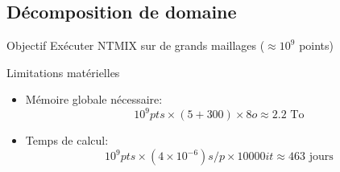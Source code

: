 \documentclass{beamer}
\begin{document}
\subsection{Décomposition de domaine}
\begin{frame}
  \begin{block}{Objectif}
    Exécuter NTMIX sur de grands maillages ($\approx 10^9$ points)
  \end{block}
  \pause
  \begin{alertblock}{Limitations matérielles}
    \begin{itemize}
    \item     Mémoire globale nécessaire: 
      $$10^9pts \times (5+300) \times 8o \approx 2.2 \text{ To}$$
    \item     Temps de calcul: 
      $$10^9 pts\times(4\times10^{-6})s/p\times10000it\approx463 \text{ jours}$$
    \end{itemize}
  \end{alertblock}
  
\end{frame}
\end{document}
